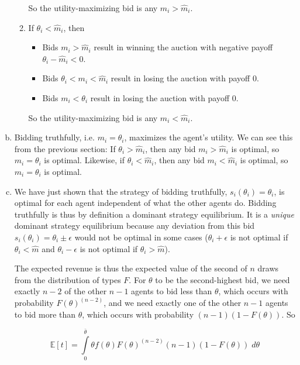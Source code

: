 \documentclass{article}
\begin{document}
\begin{enumerate}[(a)]
\begin{enumerate}[1.]
		So the utility-maximizing bid is any $m_i > \hat{m}_i$.

		\item

		If $\theta_i < \hat{m}_i$, then

		\begin{itemize}
			\item Bids $m_i > \hat{m}_i$ result in winning the auction with negative payoff $\theta_i - \hat{m}_i < 0$.
			\item Bids $\theta_i < m_i < \hat{m}_i$ result in losing the auction with payoff 0.
			\item Bids $m_i < \theta_i$ result in losing the auction with payoff 0.
		\end{itemize}

		So the utility-maximizing bid is any $m_i < \hat{m}_i$.

	\end{enumerate}

	\item

	Bidding truthfully, i.e. $m_i = \theta_i$, maximizes the agent's utility. We can see this from the previous section: If $\theta_i > \hat{m}_i$, then any bid $m_i > \hat{m}_i$ is optimal, so $m_i = \theta_i$ is optimal. Likewise, if $\theta_i < \hat{m}_i$, then any bid $m_i < \hat{m}_i$ is optimal, so $m_i = \theta_i$ is optimal. 

	\item

	We have just shown that the strategy of bidding truthfully, $s_i(\theta_i) = \theta_i$, is optimal for each agent independent of what the other agents do. Bidding truthfully is thus by definition a dominant strategy equilibrium. It is a \textit{unique} dominant strategy equilibrium because any deviation from this bid $s_i(\theta_i) = \theta_i \pm \epsilon$ would not be optimal in some cases ($\theta_i + \epsilon$ is not optimal if $\theta_i < \hat{m}$ and $\theta_i - \epsilon$ is not optimal if $\theta_i > \hat{m}$).

	The expected revenue is thus the expected value of the second of $n$ draws from the distribution of types $F$. For $\theta$ to be the second-highest bid, we need exactly $n-2$ of the other $n-1$ agents to bid less than $\theta$, which occurs with probability $F(\theta)^{(n-2)}$, and we need exactly one of the other $n-1$ agents to bid more than $\theta$, which occurs with probability $(n-1)(1-F(\theta))$. So

	\begin{equation*}
	\mathbb{E}[t] = \int \limits_0^{\bar{\theta}} \theta f(\theta) F(\theta)^{(n-2)} (n-1)(1-F(\theta)) \; d\theta
	\end{equation*}


\end{enumerate}
\end{document}
